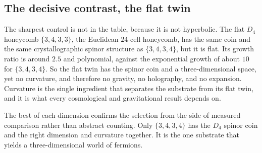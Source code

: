 \subsection{The decisive contrast, the flat twin}

The sharpest control is not in the table, because it is not hyperbolic. The flat $D_4$ honeycomb $\{3,4,3,3\}$,
the Euclidean $24$-cell honeycomb, has the same coin and the same crystallographic spinor structure as
$\{3,4,3,4\}$, but it is flat. Its growth ratio is around $2.5$ and polynomial, against the exponential growth of
about $10$ for $\{3,4,3,4\}$. So the flat twin has the spinor coin and a three-dimensional space, yet no
curvature, and therefore no gravity, no holography, and no expansion. Curvature is the single ingredient that
separates the substrate from its flat twin, and it is what every cosmological and gravitational result depends
on.


The best of each dimension confirms the selection from the side of measured comparison rather than abstract
counting. Only $\{3,4,3,4\}$ has the $D_4$ spinor coin and the right dimension and curvature together. It is the one substrate that yields a three-dimensional world of fermions.
